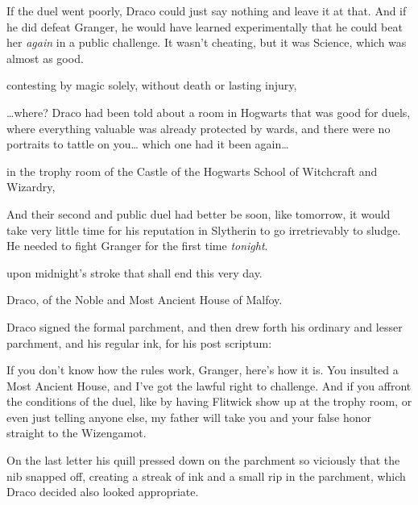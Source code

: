 If the duel went poorly, Draco could just say nothing and leave it at that. And if he did defeat Granger, he would have learned experimentally that he could beat her \emph{again} in a public challenge. It wasn't cheating, but it was Science, which was almost as good.

\begin{writtenNote}
contesting by magic solely, without death or lasting injury,
\end{writtenNote}

{\ldots}where? Draco had been told about a room in Hogwarts that was good for duels, where everything valuable was already protected by wards, and there were no portraits to tattle on you{\ldots} which one had it been again{\ldots}

\begin{writtenNote}
in the trophy room of the Castle of the Hogwarts School of Witchcraft and Wizardry,
\end{writtenNote}

And their second and public duel had better be soon, like tomorrow, it would take very little time for his reputation in Slytherin to go irretrievably to sludge. He needed to fight Granger for the first time \emph{tonight}.

\begin{writtenNote}
upon midnight's stroke that shall end this very day.

Draco, of the Noble and Most Ancient House of Malfoy.
\end{writtenNote}

Draco signed the formal parchment, and then drew forth his ordinary and lesser parchment, and his regular ink, for his post scriptum:

\begin{writtenNote}
If you don't know how the rules work, Granger, here's how it is. You insulted a Most Ancient House, and I've got the lawful right to challenge. And if you affront the conditions of the duel, like by having Flitwick show up at the trophy room, or even just telling anyone else, my father will take you and your false honor straight to the Wizengamot.

\end{writtenNote}

On the last letter his quill pressed down on the parchment so viciously that the nib snapped off, creating a streak of ink and a small rip in the parchment, which Draco decided also looked appropriate.

